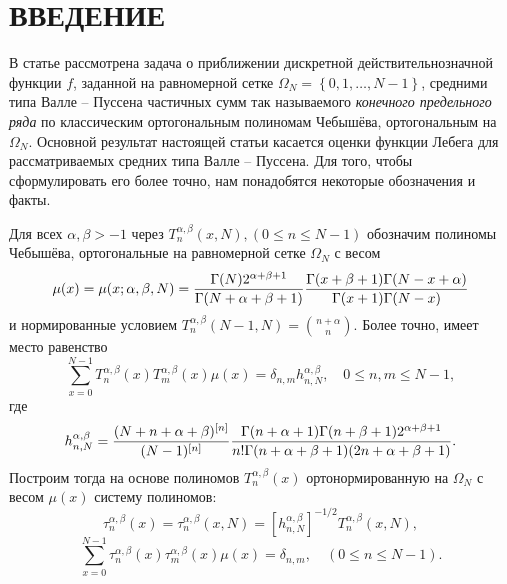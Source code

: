 \documentclass[12pt]{book}
\begin{document}

\section*{ВВЕДЕНИЕ}

В статье рассмотрена задача о приближении дискретной действительнозначной функции $f$, заданной на равномерной сетке $\Omega_N = \left\{ 0, 1, \ldots, N-1 \right\}$, средними типа Валле -- Пуссена частичных сумм так называемого \textit{конечного предельного ряда} по классическим ортогональным полиномам Чебыш\"ева, ортогональным на $\Omega_N$. Основной результат настоящей статьи касается оценки функции Лебега для рассматриваемых средних типа Валле -- Пуссена. Для того, чтобы сформулировать его более точно, нам понадобятся некоторые обозначения и факты.


Для всех $\alpha,\beta>-1$ через $T_{n}^{\alpha,\beta}(x,N), (0\le n\le N-1)$ обозначим полиномы Чебыш\"ева, ортогональные на равномерной сетке $\Omega_N$ с весом
\begin{equation}
\label{sms2eq4}
\mu(x) = \mu(x; \alpha,\beta, N)={\Gamma(N)2^{\alpha+\beta+1}\over \Gamma(N+\alpha+\beta+1)}
{\Gamma(x+\beta+1)\Gamma(N-x+\alpha)\over \Gamma(x+1)\Gamma(N-x)}
\end{equation}
и нормированные условием $T_{n}^{\alpha,\beta}(N-1,N)={n+\alpha\choose n}$. Более точно, имеет место равенство
\begin{equation*}
\sum_{x=0}^{N-1}T_{n}^{\alpha,\beta}(x) T_{m}^{\alpha,\beta}(x)
\mu(x)= \delta_{n,m}h_{n,N}^{\alpha,\beta},\quad 0\le n,m\le N-1,
\end{equation*}
где
\begin{equation}
\label{sms2hn}
h_{n,N}^{\alpha,\beta}={(N+n+\alpha+\beta)^{[n]}\over
(N-1)^{[n]}}{\Gamma(n+\alpha+1)\Gamma(n+\beta+1)
2^{\alpha+\beta+1}\over
n!\Gamma(n+\alpha+\beta+1)(2n+\alpha+\beta+1)}.
\end{equation}
Построим тогда на основе полиномов $T_{n}^{\alpha,\beta}(x)$ ортонормированную на
$\Omega_N$ с весом $\mu(x)$ систему полиномов:
\begin{equation}
\label{sms2eq5}
\tau_{n}^{\alpha,\beta}(x) = \tau_{n}^{\alpha,\beta}(x,N)=
\left[h_{n,N}^{\alpha,\beta}\right]^{-1/2}
T_{n}^{\alpha,\beta}(x,N),
\end{equation}
\begin{equation}
\label{sms2eq6}
\sum_{x=0}^{N-1}\tau_{n}^{\alpha,\beta}(x)
\tau_{m}^{\alpha,\beta}(x)\mu(x)=\delta_{n,m}, \quad (0\le n\le N-1).
\end{equation}
\end{document}
